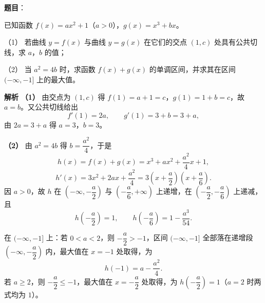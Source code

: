 \begin{answer}

\textbf{题目}：

已知函数 $f(x)=ax^2+1$（$a>0$），$g(x)=x^3+bx$。

（1） 若曲线 $y=f(x)$ 与曲线 $y=g(x)$ 在它们的交点 $(1,c)$ 处具有公共切线，求 $a$，$b$ 的值；

（2） 当 $a^2=4b$ 时，求函数 $f(x)+g(x)$ 的单调区间，并求其在区间 $(-\infty,-1]$ 上的最大值。

\textbf{解析}
\textbf{（1）} 由交点为 $(1,c)$ 得 $f(1)=a+1=c$，$g(1)=1+b=c$，故 $a=b$。又公共切线给出
\nopagebreak[4]
\[f'(1)=2a,\qquad g'(1)=3+b=3+a,\]
由 $2a=3+a$ 得 $a=3$，$b=3$。

\textbf{（2）} 由 $a^2=4b$ 得 $b=\dfrac{a^2}4$，于是
\nopagebreak[4]
\[h(x)=f(x)+g(x)=x^3+ax^2+\frac{a^2}4x+1,\]
\nopagebreak[4]
\[h'(x)=3x^2+2ax+\frac{a^2}4=3\left(x+\frac a2\right)\left(x+\frac a6\right).\]
因 $a>0$，故 $h$ 在 $\left(-\infty,-\dfrac a2\right)$ 与 $\left(-\dfrac a6,+\infty\right)$ 上递增，在 $\left(-\dfrac a2,-\dfrac a6\right)$ 上递减，且
\nopagebreak[4]
\[h\left(-\frac a2\right)=1,\qquad h\left(-\frac a6\right)=1-\frac{a^3}{54}.\]

在 $(-\infty,-1]$ 上：若 $0<a<2$，则 $-\dfrac a2>-1$，区间 $(-\infty,-1]$ 全部落在递增段 $\left(-\infty,-\dfrac a2\right)$ 内，最大值在 $x=-1$ 处取得，为
\nopagebreak[4]
\[h(-1)=a-\frac{a^2}4.\]
若 $a\geqslant2$，则 $-\dfrac a2\leqslant-1$，最大值在 $x=-\dfrac a2$ 处取得，为 $h\left(-\dfrac a2\right)=1$（$a=2$ 时两式均为 $1$）。



\end{answer}
